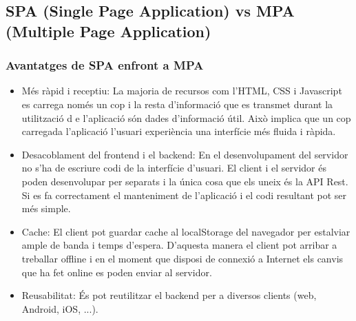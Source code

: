 \documentclass[12pt, titlepage]{article}
\begin{document}
\subsection{SPA (Single Page Application) vs MPA (Multiple Page Application)}

\subsubsection{Avantatges de SPA enfront a MPA}
\begin{itemize}

\item Més ràpid i receptiu: La majoria de recursos com l’HTML, CSS i Javascript
es carrega només un cop i la resta d’informació que es transmet durant la utilització d
e l’aplicació són dades d’informació útil. Això implica que un cop carregada l’aplicació
l’usuari experiència una interfície més fluida i ràpida.

\item Desacoblament del frontend i el backend: En el desenvolupament del servidor
no s’ha de escriure codi de la interfície d’usuari. El client i el servidor és
poden desenvolupar per separats i la única cosa que els uneix és la API Rest.
Si es fa correctament el manteniment de l’aplicació i el codi resultant pot ser
més simple.

\item Cache: El client pot guardar cache al localStorage del navegador per estalviar
ample de banda i temps d’espera. D’aquesta manera el client pot arribar a treballar
offline i en el moment que disposi de connexió a Internet els canvis que ha fet
online es poden enviar al servidor.

\item Reusabilitat: És pot reutilitzar el backend per a diversos clients (web, Android, iOS, ...).
\end{itemize}
\end{document}

